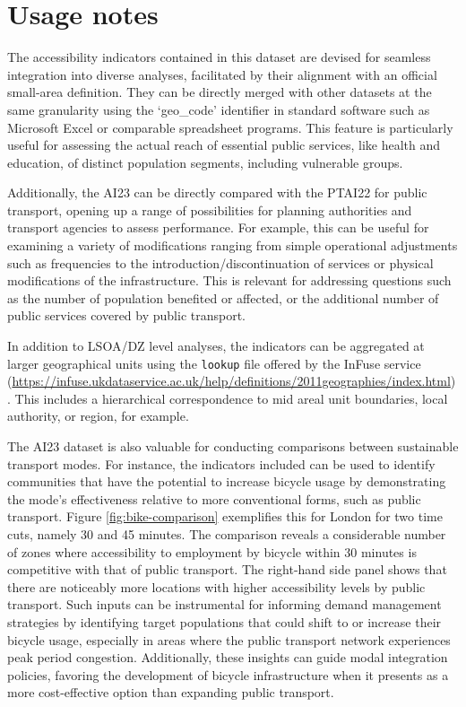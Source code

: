 \documentclass{article}
\begin{document}
\hypertarget{usage-notes}{%
\section{Usage notes}\label{usage-notes}}

The accessibility indicators contained in this dataset are devised for
seamless integration into diverse analyses, facilitated by their
alignment with an official small-area definition. They can be directly
merged with other datasets at the same granularity using the `geo\_code'
identifier in standard software such as Microsoft Excel or comparable
spreadsheet programs. This feature is particularly useful for assessing
the actual reach of essential public services, like health and
education, of distinct population segments, including vulnerable groups.

Additionally, the AI23 can be directly compared with the PTAI22 for
public transport, opening up a range of possibilities for planning
authorities and transport agencies to assess performance. For example,
this can be useful for examining a variety of modifications ranging from
simple operational adjustments such as frequencies to the
introduction/discontinuation of services or physical modifications of
the infrastructure. This is relevant for addressing questions such as
the number of population benefited or affected, or the additional number
of public services covered by public transport.

In addition to LSOA/DZ level analyses, the indicators can be aggregated
at larger geographical units using the \texttt{lookup} file offered by
the InFuse service
(\url{https://infuse.ukdataservice.ac.uk/help/definitions/2011geographies/index.html}).
This includes a hierarchical correspondence to mid areal unit
boundaries, local authority, or region, for example.

The AI23 dataset is also valuable for conducting comparisons between
sustainable transport modes. For instance, the indicators included can
be used to identify communities that have the potential to increase
bicycle usage by demonstrating the mode's effectiveness relative to more
conventional forms, such as public transport. Figure
\ref{fig:bike-comparison} exemplifies this for London for two time cuts,
namely 30 and 45 minutes. The comparison reveals a considerable number
of zones where accessibility to employment by bicycle within 30 minutes
is competitive with that of public transport. The right-hand side panel
shows that there are noticeably more locations with higher accessibility
levels by public transport. Such inputs can be instrumental for
informing demand management strategies by identifying target populations
that could shift to or increase their bicycle usage, especially in areas
where the public transport network experiences peak period congestion.
Additionally, these insights can guide modal integration policies,
favoring the development of bicycle infrastructure when it presents as a
more cost-effective option than expanding public transport.
\end{document}
